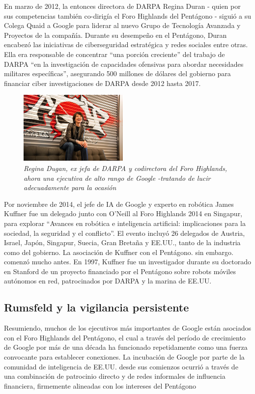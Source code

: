 \documentclass[10pt,a5paper,twoside,spanish,]{book}
\begin{document}
En marzo de 2012, la entonces directora de DARPA Regina Duran - quien
por sus competencias también co-dirigía el Foro Highlands del Pentágono
- siguió a su Colega Quaid a Google para liderar al nuevo Grupo de
Tecnología Avanzada y Proyectos de la compañía. Durante su desempeño en
el Pentágono, Duran encabezó las iniciativas de ciberseguridad
estratégica y redes sociales entre otras. Ella era responsable de
concentrar ``una porción creciente'' del trabajo de DARPA ``en la
investigación de capacidades ofensivas para abordar necesidades
militares específicas'', asegurando 500 millones de dólares del gobierno
para financiar ciber investigaciones de DARPA desde 2012 hasta 2017.

\begin{figure}[htbp]
\centering
\includegraphics{1.8.png}
\caption{\emph{Regina Dugan, ex jefa de DARPA y codirectora del Foro
Highlands, ahora una ejecutiva de alto rango de Google -tratando de
lucir adecuadamente para la ocasión}}
\end{figure}

Por noviembre de 2014, el jefe de IA de Google y experto en robótica
James Kuffner fue un delegado junto con O'Neill al Foro Highlands 2014
en Singapur, para explorar ``Avances en robótica e inteligencia
artificial: implicaciones para la sociedad, la seguridad y el
conflicto''. El evento incluyó 26 delegados de Austria, Israel, Japón,
Singapur, Suecia, Gran Bretaña y EE.UU., tanto de la industria como del
gobierno. La asociación de Kuffner con el Pentágono. sin embargo.
comenzó mucho antes. En 1997, Kuffner fue un investigador durante su
doctorado en Stanford de un proyecto financiado por el Pentágono sobre
robots móviles autónomos en red, patrocinados por DARPA y la marina de
EE.UU.

\subsection{Rumsfeld y la vigilancia
persistente}\label{rumsfeld-y-la-vigilancia-persistente}

Resumiendo, muchos de los ejecutivos más importantes de Google están
asociados con el Foro Highlands del Pentágono, el cual a través del
período de crecimiento de Google por más de una década ha funcionado
repetidamente como una fuerza convocante para establecer conexiones. La
incubación de Google por parte de la comunidad de inteligencia de EE.UU.
desde sus comienzos ocurrió a través de una combinación de patrocinio
directo y de redes informales de influencia financiera, firmemente
alineadas con los intereses del Pentágono
\end{document}
